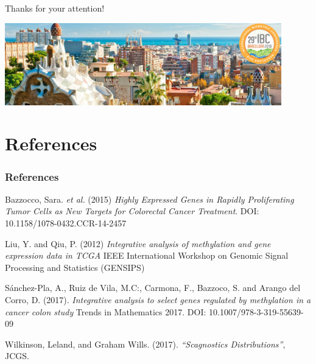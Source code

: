 \documentclass[handout]{beamer}
\begin{document}
\begin{frame}
	\begin{center}
		{\Huge
			Thanks for your attention!}
	\end{center}
	
	\begin{center}
		\includegraphics[width=0.9\textwidth]{./images/ibc-2018-barcelona.jpg}
	\end{center}
	
	
\end{frame}





\section*{References}
\begin{frame}\frametitle{References}
\begin{thebibliography}{9}

%




 Bazzocco, Sara. \emph{et al.} (2015) \emph{Highly Expressed Genes in Rapidly Proliferating Tumor Cells as New Targets for Colorectal Cancer Treatment}. DOI: 10.1158/1078-0432.CCR-14-2457

 Liu, Y. and Qiu, P. (2012) \emph{Integrative analysis of methylation and gene expression data in TCGA} IEEE International Workshop on Genomic Signal Processing and Statistics (GENSIPS)

 Sánchez-Pla, A., Ruiz de Vila, M.C:, Carmona, F., Bazzoco, S. and Arango del Corro, D. (2017). 
\emph{Integrative analysis to select genes regulated by methylation in a cancer colon study} Trends in Mathematics 2017. DOI: 10.1007/978-3-319-55639-09

 Wilkinson, Leland, and Graham Wills. (2017). 
\emph{``Scagnostics Distributions''}, JCGS.

\end{thebibliography}

\end{frame}
\end{document}
